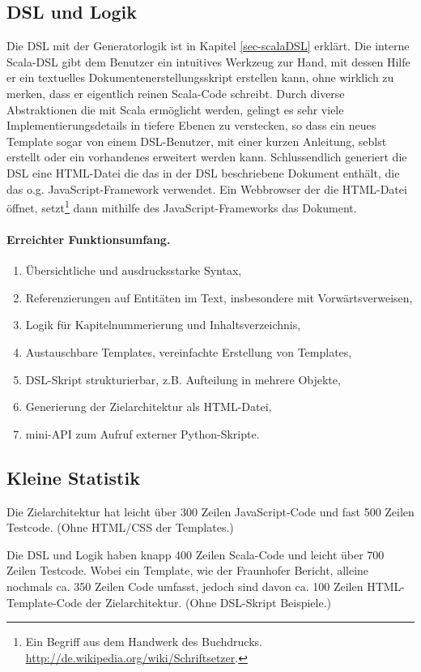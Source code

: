 \subsection{DSL und Logik}

Die DSL mit der Generatorlogik ist in Kapitel \ref{sec-scalaDSL} erklärt.
Die interne Scala-DSL gibt dem Benutzer ein intuitives Werkzeug zur Hand,
mit dessen Hilfe er ein textuelles Dokumentenerstellungsskript erstellen kann,
ohne wirklich zu merken, dass er eigentlich reinen Scala-Code schreibt.
Durch diverse Abstraktionen die mit Scala ermöglicht werden, gelingt es
sehr viele Implementierungsdetails in tiefere Ebenen zu verstecken, so
dass ein neues Template sogar von einem DSL-Benutzer, mit einer kurzen
Anleitung, seblst erstellt oder ein vorhandenes erweitert werden kann.
Schlussendlich generiert die DSL eine HTML-Datei die das in der DSL
beschriebene Dokument enthält, die das o.g. JavaScript-Framework verwendet.
Ein Webbrowser der die HTML-Datei öffnet, setzt\footnote{
Ein Begriff aus dem Handwerk des Buchdrucks.
\url{http://de.wikipedia.org/wiki/Schriftsetzer}.}
dann mithilfe des JavaScript-Frameworks das Dokument.

\paragraph{Erreichter Funktionsumfang.}

\def\erreichtDSL{
\begin{enumerate}
  \item Übersichtliche und ausdrucksstarke Syntax,
  \item Referenzierungen auf Entitäten im Text, insbesondere mit
        Vorwärtsverweisen,
  \item Logik für Kapitelnummerierung und Inhaltsverzeichnis,
  \item Austauschbare Templates, vereinfachte Erstellung von Templates,
  \item DSL-Skript strukturierbar, z.B. Aufteilung in mehrere Objekte,
  \item Generierung der Zielarchitektur als HTML-Datei,
  \item mini-API zum Aufruf externer Python-Skripte.
\end{enumerate}
}
\erreichtDSL

\subsection{Kleine Statistik}

Die Zielarchitektur hat leicht über 300 Zeilen JavaScript-Code und
fast 500 Zeilen Testcode. (Ohne HTML/CSS der Templates.)

Die DSL und Logik haben knapp 400 Zeilen Scala-Code und leicht über 700 Zeilen
Testcode. Wobei ein Template, wie der Fraunhofer Bericht, alleine nochmals
ca. 350 Zeilen Code umfasst, jedoch sind davon ca. 100 Zeilen HTML-Template-Code
der Zielarchitektur. (Ohne DSL-Skript Beispiele.)
